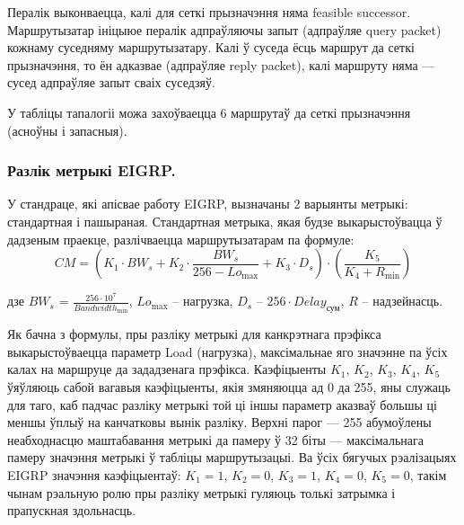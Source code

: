 Пералік выконваецца, калі для сеткі прызначэння няма feasible successor. Маршрутызатар ініцыюе пералік адпраўляючы запыт (адпраўляе query packet) кожнаму суседняму маршрутызатару. Калі ў суседа ёсць маршрут да сеткі прызначэння, то ён адказвае (адпраўляе reply packet), калі маршруту няма --- сусед адпраўляе запыт сваіх суседзяў.

У табліцы тапалогіі можа захоўваецца 6 маршрутаў да сеткі прызначэння (асноўны і запасныя).

\subsubsection{Разлік метрыкі EIGRP.}

У стандраце, які апісвае работу EIGRP, вызначаны 2 варыянты метрыкі:
стандартная і пашыраная. Стандартная метрыка, якая будзе выкарыстоўвацца ў дадзеным праекце, разлічваецца маршрутызатарам
па формуле:
\begin{equation}
    CM = \left(K_1 \cdot BW_s + K_2 \cdot \frac{BW_s}{256 -Lo_\text{max}} + K_3 \cdot D_s\right) \cdot \left(\frac{K_5}{K_4 + R_\text{min}}\right)
\end{equation}
\begin{Explanation}
    \item[дзе] $BW_s$ = $\frac{256 \cdot 10^7}{Bandwidth_\text{min}}$,
    $Lo_\text{max}$ -- нагрузка,
    $D_s$ -- $256 \cdot Delay_\text{сум}$,
    $R$ -- надзейнасць.
\end{Explanation}

Як бачна з формулы, пры разліку метрыкі для канкрэтнага прэфікса
выкарыстоўваецца параметр Load (нагрузка), максімальнае яго значэнне па ўсіх калах на маршруце да зададзенага прэфікса.
Каэфіцыенты $K_1$, $K_2$, $K_3$, $K_4$, $K_5$ ўяўляюць сабой вагавыя
каэфіцыенты, якія змяняюцца ад 0 да 255, яны служаць для таго, каб падчас разліку метрыкі
той ці іншы параметр аказваў большы ці меншы ўплыў на канчатковы
вынік разліку. Верхні парог --- 255 абумоўлены неабходнасцю маштабавання метрыкі да памеру ў 32 біты --- максімальнага памеру значэння
метрыкі ў табліцы маршрутызацыі. Ва ўсіх бягучых рэалізацыях EIGRP значэння
каэфіцыентаў: $K_1 = 1$, $K_2 = 0$, $K_3 = 1$, $K_4 = 0$, $K_5 = 0$, такім чынам рэальную ролю пры разліку
метрыкі гуляюць толькі затрымка і прапускная здольнасць.

